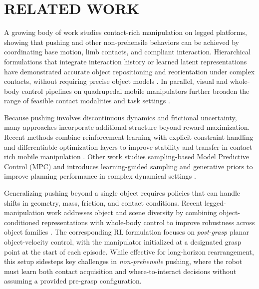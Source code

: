 \section{RELATED WORK}
\label{sec:related_work}

A growing body of work studies contact-rich manipulation on legged platforms, showing that pushing and other non-prehensile behaviors can be achieved by coordinating base motion, limb contacts, and compliant interaction. Hierarchical formulations that integrate interaction history or learned latent representations have demonstrated accurate object repositioning and reorientation under complex contacts, without requiring precise object models \cite{Jeon2023WholeBodyQuadruped}. In parallel, visual and whole-body control pipelines on quadrupedal mobile manipulators further broaden the range of feasible contact modalities and task settings \cite{liu2024visual, sq-grasp}.

Because pushing involves discontinuous dynamics and frictional uncertainty, many approaches incorporate additional structure beyond reward maximization. Recent methods combine reinforcement learning with explicit constraint handling and differentiable optimization layers to improve stability and transfer in contact-rich mobile manipulation \cite{dadiotis2025dynamic}. Other work studies sampling-based Model Predictive Control (MPC) and introduces learning-guided sampling and generative priors to improve planning performance in complex dynamical settings \cite{brudermuller2026generative}.

Generalizing pushing beyond a single object requires policies that can handle shifts in geometry, mass, friction, and contact conditions. Recent legged-manipulation work addresses object and scene diversity by combining object-conditioned representations with whole-body control to improve robustness across object families \cite{li2025robotmoverlearninglargeobjects}. The corresponding RL formulation focuses on \emph{post-grasp} planar object-velocity control, with the manipulator initialized at a designated grasp point at the start of each episode. While effective for long-horizon rearrangement, this setup sidesteps key challenges in \emph{non-prehensile} pushing, where the robot must learn both contact acquisition and where-to-interact decisions without assuming a provided pre-grasp configuration.


